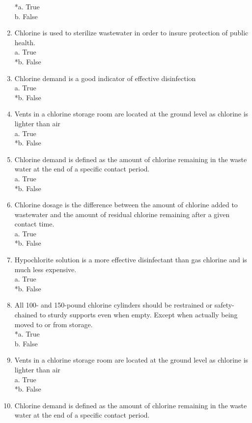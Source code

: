 \begin{enumerate}
*a. True \\
b. False \\
\item Chlorine is used to sterilize wastewater in order to insure protection of public health. \\
a. True \\
*b. False \\
\item Chlorine demand is a good indicator of effective disinfection \\
a. True \\
*b. False \\
\item Vents in a chlorine storage room are located at the ground level as chlorine is lighter than air \\
a. True \\
*b. False \\
\item Chlorine demand is defined as the amount of chlorine remaining in the waste water at the end of a specific contact period. \\
a. True \\
*b. False \\
\item Chlorine dosage is the difference between the amount of chlorine added to wastewater and the amount of residual chlorine remaining after a given contact time. \\
a. True \\
*b. False \\
\item Hypochlorite solution is a more effective disinfectant than gas chlorine and is much less expensive. \\
a. True \\
*b. False \\
\item All 100- and 150-pound chlorine cylinders should be restrained or safety-chained to sturdy supports even when empty. Except when actually being moved to or from storage. \\
*a. True \\
b. False \\
\item Vents in a chlorine storage room are located at the ground level as chlorine is lighter than air \\
a. True \\
*b. False \\
\item Chlorine demand is defined as the amount of chlorine remaining in the waste water at the end of a specific contact period. \\

\end{enumerate}
